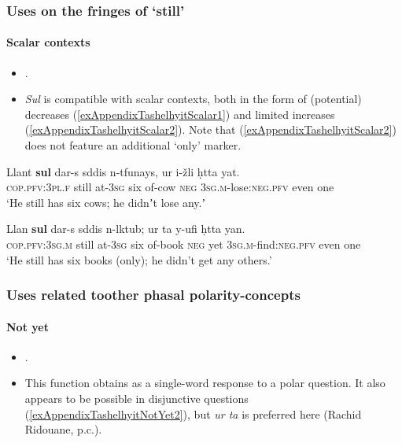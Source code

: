 \subsubsection{Uses on the fringes of \lq still\rq{}}
\paragraph{Scalar contexts}
\label{appendixTashelhyitScalar}
\begin{itemize}
	\item \textcite{Fanego2021}.
	\item \textit{Sul} is compatible with scalar contexts, both in the form of (potential) decreases (\ref{exAppendixTashelhyitScalar1}) and limited increases (\ref{exAppendixTashelhyitScalar2}). Note that (\ref{exAppendixTashelhyitScalar2}) does not feature an additional \lq only\rq{ }marker.
\end{itemize}
\begin{exe}

	\ex\label{exAppendixTashelhyitScalar1}
	\gll Llant \textbf{sul} dar-s  sddis n-tfunays, ur i-žli ḥtta yat.\\
	\textsc{cop}.\textsc{pfv}:3\textsc{pl}.\textsc{f} still at-3\textsc{sg} six of-cow \textsc{neg} 3\textsc{sg}.\textsc{m}-lose:\textsc{neg}.\textsc{pfv} even one\\
	\glt \lq He still has six cows; he didnʼt lose any.ʼ \parencite[342]{Fanego2021} 

	\ex\label{exAppendixTashelhyitScalar2}
	\gll Llan \textbf{sul} dar-s sddis n-lktub; ur ta y-ufi ḥtta yan.\\
	\textsc{cop}.\textsc{pfv}:3\textsc{sg}.\textsc{m} still at-3\textsc{sg} six of-book \textsc{neg} yet 3\textsc{sg}.\textsc{m}-find:\textsc{neg}.\textsc{pfv} even one\\
	\glt \lq He still has six books (only); he didn’t get any others.' \parencite[343]{Fanego2021}
\end{exe}

\subsubsection{Uses related toother phasal polarity-concepts}
\paragraph{Not yet}\label{appendixTashelhyitNotYet}
\begin{itemize}
	\item \textcite{Fanego2021}.
	\item This function obtains as a single-word response to a polar question. It also appears to be possible in disjunctive questions (\ref{exAppendixTashelhyitNotYet2}), but \textit{ur ta} is preferred here (Rachid Ridouane, p.c.).
\end{itemize}

